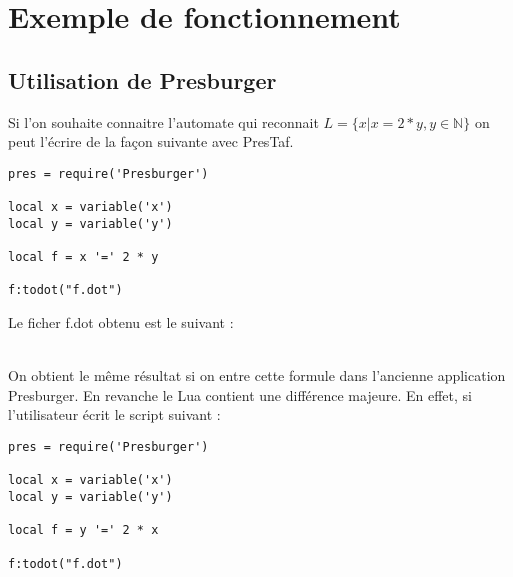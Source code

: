 \section{Exemple de fonctionnement}

\subsection{Utilisation de Presburger}

Si l'on souhaite connaitre l'automate qui reconnait $L = \{x | x = 2*y, y \in \mathbb{N} \}$ on peut l'écrire de la façon suivante avec PresTaf.\\


\begin{lstlisting}[mathescape=true, frame=single]
pres = require('Presburger')

local x = variable('x')
local y = variable('y')

local f = x '=' 2 * y 

f:todot("f.dot")
\end{lstlisting}

Le ficher f.dot obtenu est le suivant :

\vspace{0.5cm}

\\

On obtient le même résultat si on entre cette formule dans l'ancienne application Presburger. En revanche le Lua contient une différence majeure. En effet, si l'utilisateur écrit le script suivant :

\begin{lstlisting}[mathescape=true, frame=single]
pres = require('Presburger')

local x = variable('x')
local y = variable('y')

local f = y '=' 2 * x 

f:todot("f.dot")
\end{lstlisting}


